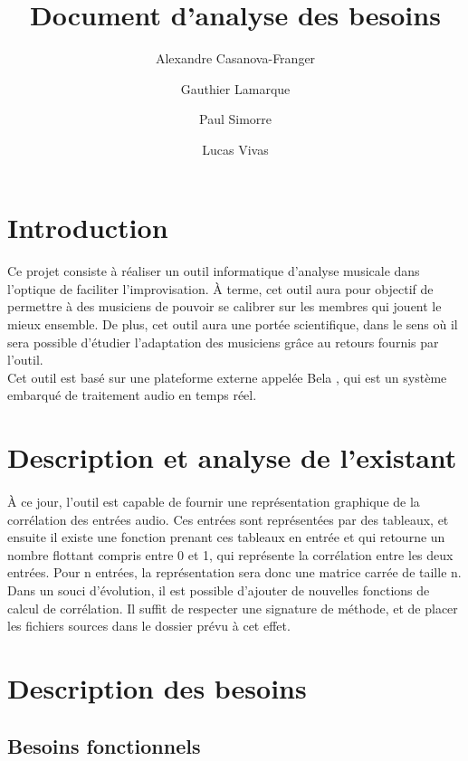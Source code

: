 \documentclass{article}
\title{Document d'analyse des besoins}
\author{Alexandre Casanova-Franger\\
        \and
        Gauthier Lamarque\\
        \and
        Paul Simorre\\
        \and
        Lucas Vivas\\}
\begin{document}
  \maketitle
  \section{Introduction}
    \paragraph{}
    Ce projet consiste à réaliser un outil informatique d'analyse musicale dans
    l'optique de faciliter l'improvisation. À terme, cet outil aura pour
    objectif de permettre à des musiciens de pouvoir se calibrer sur les membres
    qui jouent le mieux ensemble. De plus, cet outil aura une portée
    scientifique, dans le sens où il sera possible d'étudier l'adaptation des
    musiciens grâce au retours fournis par l'outil. \\
    Cet outil est basé sur une plateforme externe appelée Bela \cite{BELA}, qui
    est un système embarqué de traitement audio en temps réel.
  \section{Description et analyse de l'existant}
    \paragraph{}
    À ce jour, l'outil est capable de fournir une représentation graphique de la
    corrélation des entrées audio. Ces entrées sont représentées par des
    tableaux, et ensuite il existe une fonction prenant ces tableaux en entrée
    et qui retourne un nombre flottant compris entre 0 et 1, qui représente la
    corrélation entre les deux entrées. Pour n entrées, la représentation sera
    donc une matrice carrée de taille n.\\
    Dans un souci d'évolution, il est possible d'ajouter de nouvelles fonctions
    de calcul de corrélation. Il suffit de respecter une signature de méthode,
    et de placer les fichiers sources dans le dossier prévu à cet effet.\\
  \section{Description des besoins}
    \subsection{Besoins fonctionnels}
\end{document}
